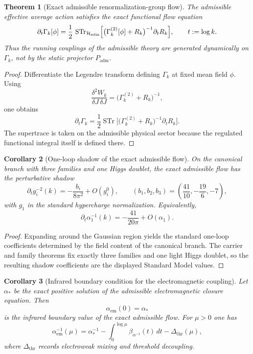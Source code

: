 \documentclass[11pt,a4paper]{article}
\newtheorem{theorem}{Theorem}[section]
\newtheorem{corollary}[theorem]{Corollary}
\theoremstyle{definition}
\theoremstyle{remark}
\newcommand{\Padm}{P_{\mathrm{adm}}}
\begin{document}
\begin{theorem}[Exact admissible renormalization-group flow]
\label{thm:exact-admissible-rg-flow}
The admissible effective average action satisfies the exact functional flow equation
\[
\partial_t \Gamma_k[\phi]
=
\frac12\,
\operatorname{STr}_{\mathcal H_{\mathrm{adm}}}
\Bigl[
\bigl(\Gamma_k^{(2)}[\phi]+R_k\bigr)^{-1}
\partial_t R_k
\Bigr],
\qquad
t:=\log k.
\]
Thus the running couplings of the admissible theory are generated dynamically on $\Gamma_k$, not by
the static projector $\Padm$.
\end{theorem}

\begin{proof}
Differentiate the Legendre transform defining $\Gamma_k$ at fixed mean field $\phi$. Using
\[
\frac{\delta^2 W_k}{\delta J\,\delta J}
=
\bigl(\Gamma_k^{(2)}+R_k\bigr)^{-1},
\]
one obtains
\[
\partial_t \Gamma_k
=
\frac12 \operatorname{STr}
\bigl[
\bigl(\Gamma_k^{(2)}+R_k\bigr)^{-1}\partial_t R_k
\bigr].
\]
The supertrace is taken on the admissible physical sector because the regulated functional integral
itself is defined there.
\end{proof}

\begin{corollary}[One-loop shadow of the exact admissible flow]
\label{cor:one-loop-shadow-exact-flow}
On the canonical branch with three families and one Higgs doublet, the exact admissible flow has
the perturbative shadow
\[
\partial_t g_i^{-2}(k)=-\frac{b_i}{8\pi^2}+O(g_i^0),
\qquad
(b_1,b_2,b_3)=\left(\frac{41}{10},-\frac{19}{6},-7\right),
\]
with $g_1$ in the standard hypercharge normalization. Equivalently,
\[
\partial_t \alpha_1^{-1}(k)=-\frac{41}{20\pi}+O(\alpha_1).
\]
\end{corollary}

\begin{proof}
Expanding  around the Gaussian region yields the standard
one-loop coefficients determined by the field content of the canonical branch. The carrier and
family theorems fix exactly three families and one light Higgs doublet, so the resulting shadow
coefficients are the displayed Standard Model values.
\end{proof}

\begin{corollary}[Infrared boundary condition for the electromagnetic coupling]
\label{cor:em-ir-boundary-condition}
Let $\alpha_\ast$ be the exact positive solution of the admissible electromagnetic closure equation.
Then
\[
\alpha_{\mathrm{em}}(0)=\alpha_\ast
\]
is the infrared boundary value of the exact admissible flow. For $\mu>0$ one has
\[
\alpha_{\mathrm{em}}^{-1}(\mu)
=
\alpha_\ast^{-1}
-\int_0^{\log\mu}\beta_{\alpha^{-1}}(t)\,dt
-\Delta_{\mathrm{thr}}(\mu),
\]
where $\Delta_{\mathrm{thr}}$ records electroweak mixing and threshold decoupling.
\end{corollary}
\end{document}
